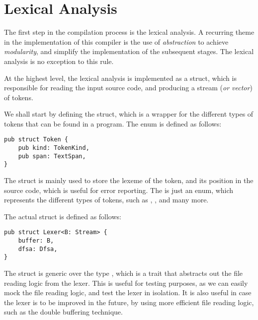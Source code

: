 
\section{Lexical Analysis}

The first step in the compilation process is the lexical analysis. A recurring
theme in the implementation of this compiler is the use of \textit{abstraction}
to achieve \textit{modularity}, and simplify the implementation of the
subsequent stages. The lexical analysis is no exception to this rule.

At the highest level, the lexical analysis is implemented as a 
struct, which is responsible for reading the input source code, and producing a
stream (\textit{or vector}) of tokens.

We shall start by defining the  struct, which is a wrapper for the
different types of tokens that can be found in a  program. The
 enum is defined as follows:

\begin{mainbox}{}
    \lstset{belowskip=0pt, aboveskip=0pt}
    \begin{lstlisting}
pub struct Token {
    pub kind: TokenKind,
    pub span: TextSpan,
}
    \end{lstlisting}
\end{mainbox}

The  struct is mainly used to store the lexeme of the token, and
its position in the source code, which is useful for error reporting. The
 is just an enum, which represents the different types of tokens, such as ,
,  and many more.


The actual  struct is defined as follows:

\begin{mainbox}{}
    \lstset{belowskip=0pt, aboveskip=0pt}
    \begin{lstlisting}[caption={The \code{Lexer} struct.}]
pub struct Lexer<B: Stream> {
    buffer: B,
    dfsa: Dfsa,
}
    \end{lstlisting}
\end{mainbox}

The  struct is generic over the type , which is a trait that
abstracts out the file reading logic from the lexer. This is useful for testing
purposes, as we can easily mock the file reading logic, and test the lexer in
isolation. It is also useful in case the lexer is to be improved in the future,
by using more efficient file reading logic, such as the double buffering
technique.

